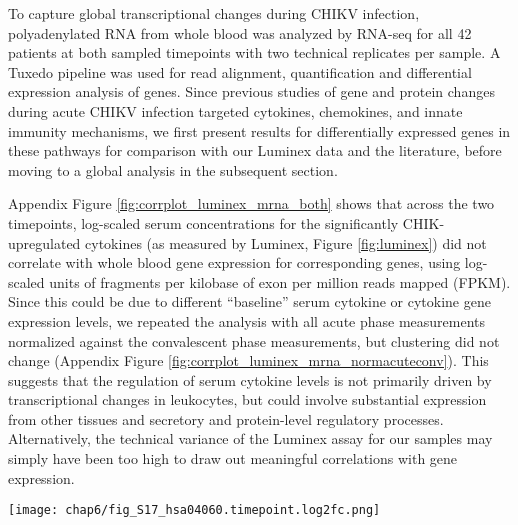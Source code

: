 To capture global transcriptional changes during CHIKV infection, polyadenylated RNA from whole blood was analyzed by RNA-seq for all 42 patients at both sampled timepoints with two technical replicates per sample. A Tuxedo pipeline was used for read alignment, quantification and differential expression analysis of genes. Since previous studies of gene and protein changes during acute CHIKV infection targeted cytokines, chemokines, and innate immunity mechanisms,\autocite{Chow2011,Hoarau2010,Ng2009,Teng2015,Wauquier2011} we first present results for differentially expressed genes in these pathways for comparison with our Luminex data and the literature, before moving to a global analysis in the subsequent section.

Appendix Figure \ref{fig:corrplot_luminex_mrna_both} shows that across the two timepoints, log-scaled serum concentrations for the significantly CHIK-upregulated cytokines (as measured by Luminex, Figure \ref{fig:luminex}) did not correlate with whole blood gene expression for corresponding genes, using log-scaled units of fragments per kilobase of exon per million reads mapped (FPKM). Since this could be due to different “baseline” serum cytokine or cytokine gene expression levels, we repeated the analysis with all acute phase measurements normalized against the convalescent phase measurements, but clustering did not change (Appendix Figure \ref{fig:corrplot_luminex_mrna_normacuteconv}). This suggests that the regulation of serum cytokine levels is not primarily driven by transcriptional changes in leukocytes, but could involve substantial expression from other tissues and secretory and protein-level regulatory processes. Alternatively, the technical variance of the Luminex assay for our samples may simply have been too high to draw out meaningful correlations with gene expression. 

\begin{sidewaysfigure}[hp]
  \sidewaysvspace
  \centering
  \texttt{[image: chap6/fig\_S17\_hsa04060.timepoint.log2fc.png]}
\end{sidewaysfigure}

